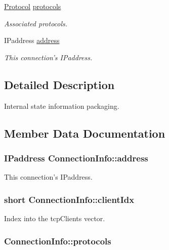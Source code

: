 \begin{DoxyCompactItemize}
\hyperlink{NetManager_8h_a9af285d1232beed01f31aac5d3a5469f}{Protocol} \hyperlink{structConnectionInfo_ad2f23f71b9b3e1a1ac56da62b7ef8ff0}{protocols}
\begin{DoxyCompactList}\small\item\em Associated protocols. \end{DoxyCompactList}\item 
I\-Paddress \hyperlink{structConnectionInfo_af014df0a6739ea51a6a532ec352f7848}{address}
\begin{DoxyCompactList}\small\item\em This connection's I\-Paddress. \end{DoxyCompactList}\end{DoxyCompactItemize}


\subsection{Detailed Description}
Internal state information packaging. 

\subsection{Member Data Documentation}
\hypertarget{structConnectionInfo_af014df0a6739ea51a6a532ec352f7848}{
\subsubsection[{address}]{\setlength{\rightskip}{0pt plus 5cm}I\-Paddress Connection\-Info\-::address}}\label{structConnectionInfo_af014df0a6739ea51a6a532ec352f7848}


This connection's I\-Paddress. 

\hypertarget{structConnectionInfo_a57fe4cd91d04afd5f802957aef5cd835}{
\subsubsection[{client\-Idx}]{\setlength{\rightskip}{0pt plus 5cm}short Connection\-Info\-::client\-Idx}}\label{structConnectionInfo_a57fe4cd91d04afd5f802957aef5cd835}


Index into the tcp\-Clients vector. 

\hypertarget{structConnectionInfo_ad2f23f71b9b3e1a1ac56da62b7ef8ff0}{
\subsubsection[{protocols}]{ Connection\-Info\-::protocols}}\label{structConnectionInfo_ad2f23f71b9b3e1a1ac56da62b7ef8ff0}


